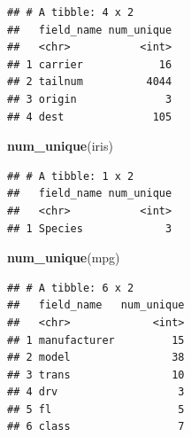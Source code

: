 \documentclass[]{book}
\newenvironment{Shaded}{\begin{snugshade}}{\end{snugshade}}
\newcommand{\ControlFlowTok}[1]{\textcolor[rgb]{0.13,0.29,0.53}{\textbf{#1}}}
\newcommand{\DataTypeTok}[1]{\textcolor[rgb]{0.13,0.29,0.53}{#1}}
\newcommand{\KeywordTok}[1]{\textcolor[rgb]{0.13,0.29,0.53}{\textbf{#1}}}
\newcommand{\NormalTok}[1]{#1}
\newcommand{\OperatorTok}[1]{\textcolor[rgb]{0.81,0.36,0.00}{\textbf{#1}}}
\newcommand{\StringTok}[1]{\textcolor[rgb]{0.31,0.60,0.02}{#1}}
\theoremstyle{definition}
\theoremstyle{definition}
\theoremstyle{definition}
\theoremstyle{remark}
\begin{document}
\begin{Shaded}
\end{Shaded}

\begin{verbatim}
## # A tibble: 4 x 2
##   field_name num_unique
##   <chr>           <int>
## 1 carrier            16
## 2 tailnum          4044
## 3 origin              3
## 4 dest              105
\end{verbatim}

\begin{Shaded}
\begin{Highlighting}[]
\KeywordTok{num_unique}\NormalTok{(iris)}
\end{Highlighting}
\end{Shaded}

\begin{verbatim}
## # A tibble: 1 x 2
##   field_name num_unique
##   <chr>           <int>
## 1 Species             3
\end{verbatim}

\begin{Shaded}
\begin{Highlighting}[]
\KeywordTok{num_unique}\NormalTok{(mpg)}
\end{Highlighting}
\end{Shaded}

\begin{verbatim}
## # A tibble: 6 x 2
##   field_name   num_unique
##   <chr>             <int>
## 1 manufacturer         15
## 2 model                38
## 3 trans                10
## 4 drv                   3
## 5 fl                    5
## 6 class                 7
\end{verbatim}
\end{document}
